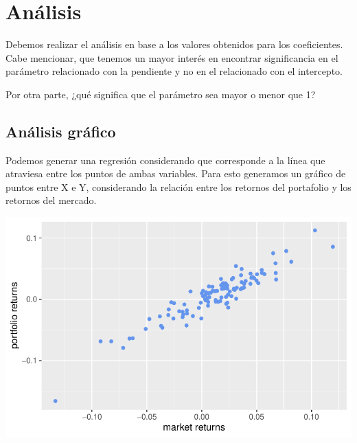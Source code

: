 \documentclass[
  letterpaper,
  DIV=11,
  numbers=noendperiod]{scrartcl}
\newenvironment{Shaded}{\begin{snugshade}}{\end{snugshade}}
\newcommand{\AttributeTok}[1]{\textcolor[rgb]{0.40,0.45,0.13}{#1}}
\newcommand{\FunctionTok}[1]{\textcolor[rgb]{0.28,0.35,0.67}{#1}}
\newcommand{\NormalTok}[1]{\textcolor[rgb]{0.00,0.23,0.31}{#1}}
\newcommand{\SpecialCharTok}[1]{\textcolor[rgb]{0.37,0.37,0.37}{#1}}
\newcommand{\StringTok}[1]{\textcolor[rgb]{0.13,0.47,0.30}{#1}}
\begin{document}
\section{Análisis}\label{anuxe1lisis}

Debemos realizar el análisis en base a los valores obtenidos para los
coeficientes. Cabe mencionar, que tenemos un mayor interés en encontrar
significancia en el parámetro relacionado con la pendiente y no en el
relacionado con el intercepto.

Por otra parte, ¿qué significa que el parámetro sea mayor o menor que 1?

\subsection{Análisis gráfico}\label{anuxe1lisis-gruxe1fico}

Podemos generar una regresión considerando que corresponde a la línea
que atraviesa entre los puntos de ambas variables. Para esto generamos
un gráfico de puntos entre X e Y, considerando la relación entre los
retornos del portafolio y los retornos del mercado.

\begin{Shaded}
\end{Shaded}

\includegraphics[width=0.4\linewidth,height=\textheight,keepaspectratio]{notebook_optimization_test_files/figure-pdf/unnamed-chunk-23-1.pdf}
\end{document}
